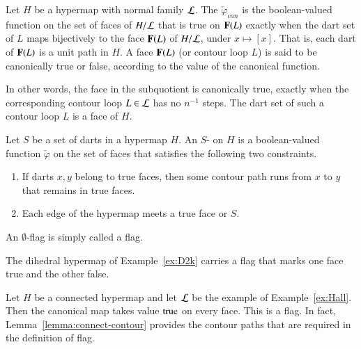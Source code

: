 \begin{definition}
Let $H$ be a hypermap with normal family $\cal
  L$.  The  $\check\varphi_{can}$ is the
  boolean-valued function on the set of faces of $H/{\cal L}$ that is
  true on ${\mathbf F}(L)$ exactly when the dart set of $L$ maps bijectively to
  the face ${\mathbf F}(L)$ of $H/{\cal L}$, under $x\mapsto [x]$.  That is,
  each dart of ${\mathbf F}(L)$ is a unit path in $H$.  A face ${\mathbf F}(L)$ (or
  contour loop $L$) is said to be canonically true or false, according
  to the value of the canonical function.
\end{definition}
%


In other words, the face in the subquotient is canonically true, exactly
when the corresponding contour loop $L\in {\cal L}$ has no $n^{-1}$
steps.  The dart set of such a contour loop $L$ is a face of $H$.  


\begin{definition}[flag]\label{def:flag} 
  Let $S$ be a set of darts in a hypermap $H$.  An $S$-
  on $H$ is a boolean-valued function $\check\varphi$ on the set of faces that
  satisfies the following two constraints.
\begin{enumerate}
\item If darts $x,y$ belong to true faces,
then  some contour path runs from $x$ to $y$ that remains
in true faces.
\item Each edge of the hypermap meets a true face or $S$.
\end{enumerate}
An $\emptyset$-flag is simply called a flag.
%
%
\end{definition}



\begin{example} \label{ex:DH}
The dihedral hypermap of Example~\ref{ex:D2k} carries a
flag that marks one face true and the other false.
\end{example}

\begin{example}\label{ex:Hall-flag} 
Let $H$ be a connected hypermap and let $\cal L$ be the example of
Example~\ref{ex:Hall}. Then the canonical map takes value
${\operatorname{true}}$ on every face.  This is a flag. In fact,
Lemma~\ref{lemma:connect-contour} provides the contour paths that
are required in the definition of flag.
\end{example}



